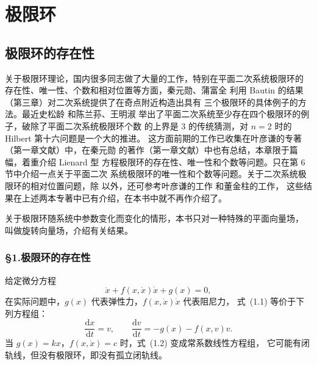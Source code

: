 
\newcommand{\chFourFigurePlaceholder}[1]{%
  \begin{center}
    \fbox{\parbox{0.72\textwidth}{\centering\vspace{2.7cm}图~#1\\（图片占位）\vspace{2.7cm}}}
  \end{center}%
}

\setchapterimage{}
\setchapterintro{}
\chapter{极限环}

\section{极限环的存在性}

关于极限环理论，国内很多同志做了大量的工作，特别在平面二次系统极限环的
存在性、唯一性、个数和相对位置等方面，秦元勋、蒲富全\cite{79} 利用
Bautin 的结果（第三章\cite{17}）对二次系统提供了在奇点附近构造出具有
三个极限环的具体例子的方法。最近史松龄\cite{4} 和陈兰荪、王明淑\cite{5}
举出了平面二次系统至少存在四个极限环的例子，破除了平面二次系统极限环个数
的上界是 $3$ 的传统猜测，对 $n=2$ 时的 Hilbert 第十六问题是一个大的推进。
这方面前期的工作已收集在叶彦谦的专著（第一章文献\cite{3}）中，在秦元勋
的著作（第一章文献\cite{2}）中也有总结，本章限于篇幅，着重介绍 Lienard 型
方程极限环的存在性、唯一性和个数等问题。只在第 6 节中介绍一点关于平面二次
系统极限环的唯一性和个数等问题。关于二次系统极限环的相对位置问题，除
\cite{4,5} 以外，还可参考叶彦谦的工作\cite{76,77} 和董金柱的工作\cite{6,7}，
这些结果在上述两本专著中已有介绍，在本书中就不再作介绍了。

关于极限环随系统中参数变化而变化的情形，本书只对一种特殊的平面向量场，
叫做旋转向量场，介绍有关结果。

\subsection*{\S 1.\quad 极限环的存在性}

给定微分方程
\[
  \ddot{x}+f(x,\dot{x})\dot{x}+g(x)=0, \tag{1.1}
\]
在实际问题中，$g(x)$ 代表弹性力，$f(x,\dot{x})\dot{x}$ 代表阻尼力，
式~(1.1) 等价于下列方程组：
\[
  \dfrac{\mathrm{d}x}{\mathrm{d}t}=v,\qquad
  \dfrac{\mathrm{d}v}{\mathrm{d}t}=-g(x)-f(x,v)v. \tag{1.2}
\]
当 $g(x)=kx$，$f(x,\dot{x})=c$ 时，式~(1.2) 变成常系数线性方程组，
它可能有闭轨线，但没有极限环，即没有孤立闭轨线。

